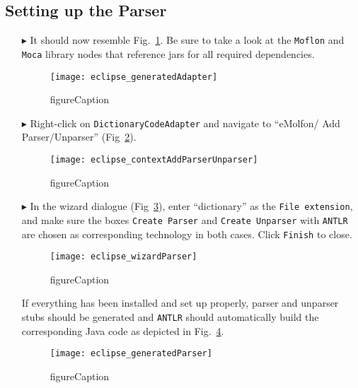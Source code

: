 \newpage
\hypertarget{subSec:setupParser}{}
\subsection{Setting up the Parser}
\genHeader

\begin{itemize}

\item[$\blacktriangleright$] It should now resemble Fig.~\ref{eclipse:generatedAdapter}. Be sure to take a look at the \texttt{Moflon} and \texttt{Moca} library
nodes that reference jars for all required dependencies.

\begin{figure}[htpb]
\begin{center}
  \texttt{[image: eclipse\_generatedAdapter]}
  \caption{figureCaption}
  \label{eclipse:generatedAdapter}
\end{center}
\end{figure}

\item[$\blacktriangleright$] Right-click on \texttt{DictionaryCodeAdapter} and navigate to ``eMolfon/ Add Parser/Unparser'' (Fig~\ref{eclipse:contextParser}).

\begin{figure}[htpb]
\begin{center}
  \texttt{[image: eclipse\_contextAddParserUnparser]}
  \caption{figureCaption}
  \label{eclipse:contextParser}
\end{center}
\end{figure}

\item[$\blacktriangleright$] In the wizard dialogue (Fig~\ref{eclipse:wizardParser}), enter ``dictionary'' as the \texttt{File extension}, and make sure
the boxes \texttt{Create Parser} and \texttt{Create Unparser} with \texttt{ANTLR} are chosen as corresponding technology in both cases. Click \texttt{Finish} to
close.

\begin{figure}[htpb]
\begin{center}
  \texttt{[image: eclipse\_wizardParser]}
  \caption{figureCaption}
  \label{eclipse:wizardParser}
\end{center}
\end{figure}

If everything has been installed and set up properly, parser and unparser stubs should be generated and \texttt{ANTLR} should automatically build the
corresponding Java code as depicted in Fig.~\ref{eclipse:generatedParser}.

\begin{figure}[htpb]
\begin{center}
  \texttt{[image: eclipse\_generatedParser]}
  \caption{figureCaption}
  \label{eclipse:generatedParser}
\end{center}
\end{figure}

\end{itemize}
